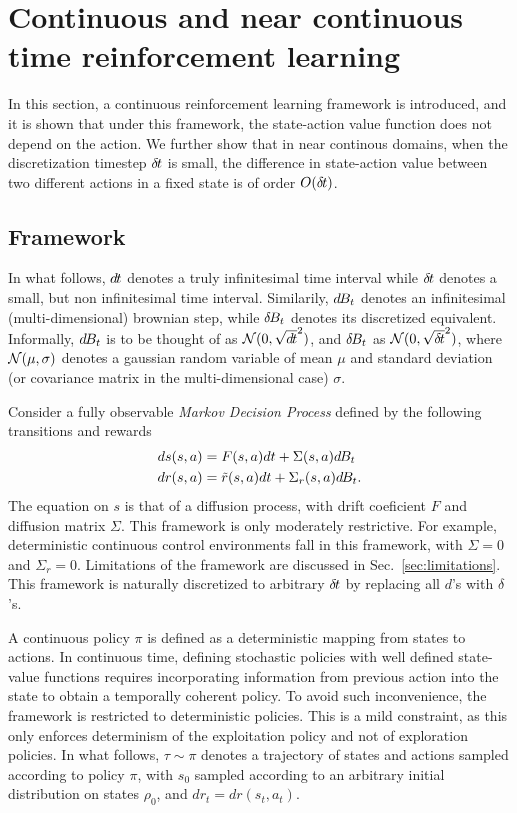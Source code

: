 \documentclass{article}
\begin{document}
\section{Continuous and near continuous time reinforcement learning}
\label{sec:continous}
In this section, a continuous reinforcement learning framework is introduced,
and it is shown that under this framework, the state-action value function does
not depend on the action. We further show that in near continous domains, when
the discretization timestep $\delta\hspace{-.1em}t$ is small, the difference in state-action
value between two different actions in a fixed state is of order $O(\delta\hspace{-.1em}t)$.

\subsection{Framework}
In what follows, $d\hspace{-.1em}t$ denotes a truly infinitesimal time interval while $\delta\hspace{-.1em}t$
denotes a small, but non infinitesimal time interval. Similarily, $d\hspace{-.1em}B_t$ denotes
an infinitesimal (multi-dimensional) brownian step, while $\delta\hspace{-.1em}B_t$ denotes its
discretized equivalent. Informally, $d\hspace{-.1em}B_t$ is to be thought of as $\mathcal{N}(0, \sqrt{d\hspace{-.1em}t}^2)$,
and $\delta\hspace{-.1em}B_t$ as $\mathcal{N}(0, \sqrt{\delta\hspace{-.1em}t}^2)$, where $\mathcal{N}(\mu, \sigma)$ denotes a gaussian
random variable of mean $\mu$ and standard deviation (or covariance matrix in the multi-dimensional case)
$\sigma$.

Consider a fully observable \emph{Markov Decision Process} defined by the following
transitions and rewards
\begin{align}
	ds(s, a) &= F(s, a) dt + \Sigma(s, a) d\hspace{-.1em}B_t\\
	dr(s, a) &= \tilde{r}(s, a) dt + \Sigma_r(s, a) d\hspace{-.1em}B_t.
\end{align}
The equation on $s$ is that of a diffusion process, with drift coeficient $F$
and diffusion matrix $\Sigma$.  This framework is only moderately restrictive.
For example, deterministic continuous control environments fall in this
framework, with $\Sigma = 0$ and $\Sigma_r = 0$. Limitations of the framework
are discussed in Sec.~\ref{sec:limitations}.
This framework is naturally discretized to arbitrary $\delta\hspace{-.1em}t$ by replacing all
$d$'s with $\delta$'s.

A continuous policy $\pi$ is defined as a deterministic mapping from states to
actions.  In continuous time, defining stochastic policies with well defined
state-value functions requires incorporating information from previous action into
the state to obtain a temporally coherent policy. To avoid such inconvenience, the
framework is restricted to deterministic policies. This is a mild constraint, as this
only enforces determinism of the exploitation policy and not of exploration policies.
In what follows, $\tau\sim\pi$ denotes a trajectory of states and actions sampled
according to policy $\pi$, with $s_0$ sampled according to an arbitrary initial distribution
on states $\rho_0$, and $dr_{t} = dr(s_t, a_t)$.
\end{document}
